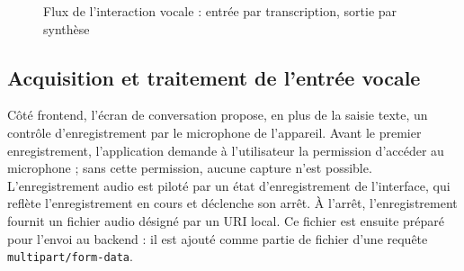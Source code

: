 \documentclass[11pt,a4paper,openany,oneside]{report}
\begin{document}
\begin{figure}[htbp]
\centering
{}
\caption{Flux de l'interaction vocale : entrée par transcription, sortie par synthèse}\label{fig:voix}
\end{figure}

\subsection{Acquisition et traitement de l'entrée vocale}
Côté frontend, l'écran de conversation propose, en plus de la saisie texte, un contrôle d'enregistrement par le microphone de l'appareil. Avant le premier enregistrement, l'application demande à l'utilisateur la permission d'accéder au microphone ; sans cette permission, aucune capture n'est possible. L'enregistrement audio est piloté par un état d'enregistrement de l'interface, qui reflète l'enregistrement en cours et déclenche son arrêt. À l'arrêt, l'enregistrement fournit un fichier audio désigné par un URI local. Ce fichier est ensuite préparé pour l'envoi au backend : il est ajouté comme partie de fichier d'une requête \texttt{multipart/form-data}.
\end{document}

